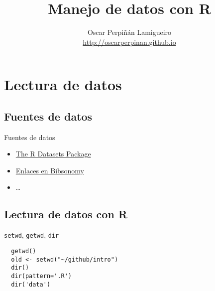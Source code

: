 \documentclass[xcolor={usenames,svgnames,dvipsnames}]{beamer}
\author{Oscar Perpiñán Lamigueiro \\ \url{http://oscarperpinan.github.io}}
\date{}
\title{Manejo de datos con R}
\begin{document}
\maketitle


\section{Lectura de datos}
\label{sec-1}
\subsection{Fuentes de datos}
\label{sec-1-1}
\begin{frame}[label=sec-1-1-1]{Fuentes de datos}
\begin{itemize}
\item \href{http://stat.ethz.ch/R-manual/R-patched/library/datasets/html/00Index.html}{The R Datasets Package}

\item \href{http://www.bibsonomy.org/user/procomun/data}{Enlaces en Bibsonomy}

\item \ldots{}
\end{itemize}
\end{frame}

\subsection{Lectura de datos con R}
\label{sec-1-2}
\begin{frame}[fragile,label=sec-1-2-1]{\texttt{setwd}, \texttt{getwd}, \texttt{dir}}
 \lstset{language=R,label= ,caption= ,numbers=none}
\begin{lstlisting}
  getwd()
  old <- setwd("~/github/intro")
  dir()
  dir(pattern='.R')
  dir('data')
\end{lstlisting}
\end{frame}
\end{document}
